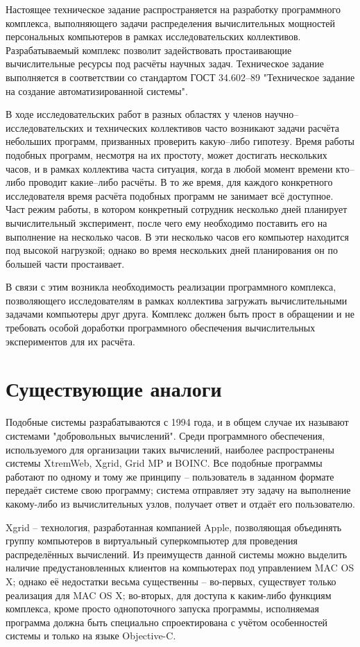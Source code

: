 \documentclass[a4paper,12pt]{report}
\numberwithin{equation}{section}
\begin{document}
Настоящее техническое задание распространяется на разработку программного комплекса, выполняющего задачи распределения вычислительных мощностей персональных компьютеров в рамках исследовательских коллективов. Разрабатываемый комплекс позволит задействовать простаивающие вычислительные ресурсы под расчёты научных задач. Техническое задание выполняется в соответствии со стандартом ГОСТ 34.602--89 "Техническое задание на создание автоматизированной системы".

В ходе исследовательских работ в разных областях у членов научно--исследовательских и технических коллективов часто возникают задачи расчёта небольших программ, призванных проверить какую--либо гипотезу. 
Время работы подобных программ, несмотря на их простоту, может достигать нескольких часов, и в рамках коллектива часта ситуация, когда в любой момент времени кто--либо проводит какие--либо расчёты. 
В то же время, для каждого конкретного исследователя время расчёта подобных программ не занимает всё доступное. 
Част режим работы, в котором конкретный сотрудник несколько дней планирует вычислительный эксперимент, после чего ему необходимо поставить его на выполнение на несколько часов. 
В эти несколько часов его компьютер находится под высокой нагрузкой; однако во время нескольких дней планирования он по большей части простаивает.

В связи с этим возникла необходимость реализации программного комплекса, позволяющего исследователям в рамках коллектива загружать вычислительными задачами компьютеры друг друга.
Комплекс должен быть прост в обращении и не требовать особой доработки программного обеспечения вычислительных экспериментов для их расчёта.

\clearpage
\section{Существующие аналоги}

Подобные системы разрабатываются с 1994 года, и в общем случае их называют системами "добровольных вычислений".
Среди программного обеспечения, используемого для организации таких вычислений, наиболее распространены системы XtremWeb, Xgrid, Grid MP и BOINC.
Все подобные программы работают по одному и тому же принципу -- пользователь в заданном формате передаёт системе свою программу; система отправляет эту задачу на выполнение какому-либо из вычислительных узлов, получает ответ и отдаёт его пользователю.

Xgrid -- технология, разработанная компанией Apple, позволяющая объединять группу компьютеров в виртуальный суперкомпьютер для проведения распределённых вычислений. 
Из преимуществ данной системы можно выделить наличие предустановленных клиентов на компьютерах под управлением MAC OS X; однако её недостатки весьма существенны -- во-первых, существует только реализация для MAC OS X; во-вторых, для доступа к каким-либо функциям комплекса, кроме просто однопоточного запуска программы, исполняемая программа должна быть специально спроектирована с учётом особенностей системы и только на языке Objective-C.
\end{document}
